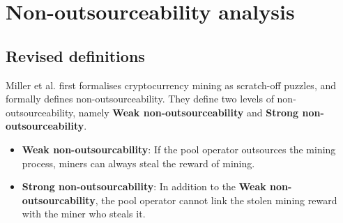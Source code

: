 \section{Non-outsourceability analysis}
\label{sec:non_outsourceability}



\subsection{Revised definitions}

Miller et al. \cite{miller2015nonoutsourceable} first formalises cryptocurrency mining as scratch-off puzzles, and formally defines non-outsourceability.
They define two levels of non-outsourceability, namely \textbf{Weak non-outsourceability} and \textbf{Strong non-outsourceability}.

\begin{itemize}
    \item \textbf{Weak non-outsourcability}: If the pool operator outsources the mining process, miners can always steal the reward of mining.
    \item \textbf{Strong non-outsourcability}: In addition to the \textbf{Weak non-outsourcability}, the pool operator cannot link the stolen mining reward with the miner who steals it.
\end{itemize}

